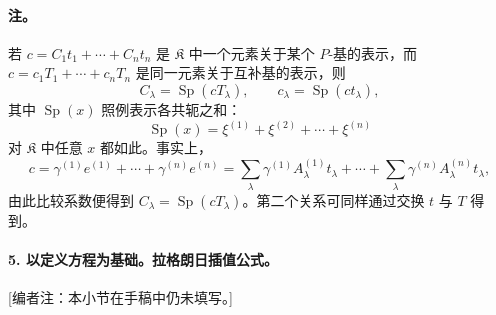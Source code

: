 \paragraph{注。}
若 $c=C_1t_1+\cdots+C_nt_n$ 是 $\mathfrak K$ 中一个元素关于某个 $P$-基的表示，而 $c=c_1T_1+\cdots+c_nT_n$ 是同一元素关于互补基的表示，则
\[
C_\lambda=\operatorname{Sp}(cT_\lambda),
\qquad c_\lambda=\operatorname{Sp}(ct_\lambda),
\]
其中 $\operatorname{Sp}(x)$ 照例表示各共轭之和：
\[
\operatorname{Sp}(x)=\xi^{(1)}+\xi^{(2)}+\cdots+\xi^{(n)}
\]
对 $\mathfrak K$ 中任意 $x$ 都如此。事实上，
\[
c=\gamma^{(1)}e^{(1)}+\cdots+\gamma^{(n)}e^{(n)}
=\sum_\lambda\gamma^{(1)}A_\lambda^{(1)}t_\lambda+
\cdots+\sum_\lambda\gamma^{(n)}A_\lambda^{(n)}t_\lambda,
\]
由此比较系数便得到 $C_\lambda=\operatorname{Sp}(cT_\lambda)$。第二个关系可同样通过交换 $t$ 与 $T$ 得到。

\paragraph{5. 以定义方程为基础。拉格朗日插值公式。}
[编者注：本小节在手稿中仍未填写。]
